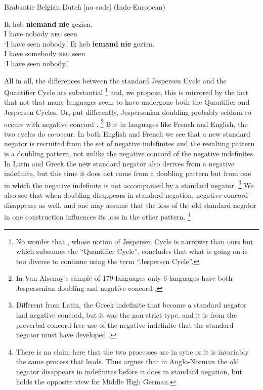 ﻿\documentclass[output=paper,draft,draftmode,colorlinks,citecolor=brown]{langscibook}
\begin{document}
\newpage
\begin{exe}\ex\label{ex:int-brabantic-nobody}
Brabantic Belgian Dutch [no code] (Indo-European)
    \begin{xlist}
    \ex\label{ex:int-brabantic-nobody-a}
    \gll Ik  heb  \textbf{niemand}  \textbf{nie}  gezien.  \\
    I  have  nobody  \textsc{neg}  seen \\
    \glt `I have seen nobody.'
    \ex\gll Ik  heb  \textbf{iemand}  \textbf{nie}  gezien.\\
    I  have  somebody  \textsc{neg}  seen\\ 
    \glt `I have seen nobody.'
    \end{xlist}\end{exe} 

All in all, the differences between the standard Jespersen Cycle and the
Quantifier Cycle are substantial%
%
    \footnote{No wonder that \citet{Larrivee2011}, whose notion of
    Jespersen Cycle is narrower than ours but which subsumes the
    ``Quantifier Cycle'', concludes that what is going on is too diverse to
    continue using the term ``Jespersen Cycle''.} %
%
and, we propose, this is mirrored by the fact that not that many languages
seem to have undergone both the Quantifier and Jespersen Cycles. Or, put
differently, Jespersenian doubling probably seldom co-occurs with negative
concord \parencites{AlsenoyAuwera2014}[182--195]{Alsenoy2016}.%
%
\footnote{In Van Alsenoy's sample of 179 languages only 6 languages have
both Jespersenian doubling and negative concord
\parencite[187]{Alsenoy2016}.} %
%
But in languages like French and English, the two
cycles do co-occur. In both English and French we see that a new standard
negator is recruited from the set of negative
indefinites and the resulting pattern is a doubling pattern, not unlike the
negative concord of the negative indefinites. In Latin and
Greek the new
standard negator also derives from a negative indefinite, but this time it
does not come from a doubling pattern but from one in which the negative
indefinite is not accompanied by a standard negator.%
%
\footnote{Different
from Latin, the Greek indefinite that became a standard negator had
negative concord, but it was the non-strict type, and it is from the
preverbal concord-free use of the negative indefinite that the standard
negator must have developed \citep[294--295]{Chatzopoulou2012}.} %
%
We also see
that when doubling disappears in standard negation, negative concord
disappears as well, and one may assume that the loss of the old standard
negator in one construction influences its loss in the other
pattern.%
%
\footnote{There is no claim here that the two processes are in sync
or it is invariably the same process that leads. Thus
\citet[152]{Ingham2011} argues that in Anglo-Norman the old negator
disappears in indefinites before it does in standard negation, but
\citet[176]{Jager2013} holds the opposite view for Middle High German.} %
\end{document}
